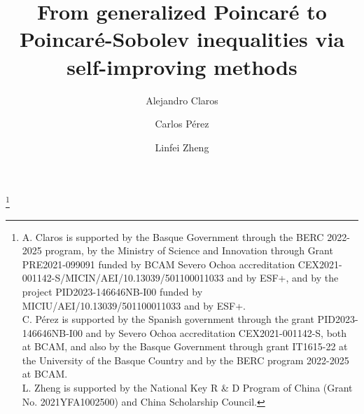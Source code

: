 \documentclass[reqno, 10pt, oneside]{amsart}
\numberwithin{equation}{section}
\numberwithin{theorem}{section}
\newcommand{\1}{{\rm 1\hspace*{-0.4ex}%
\rule{0.1ex}{1.52ex}\hspace*{0.2ex}}}
\begin{document}
\title[From generalized Poincaré to Poincaré-Sobolev inequalities]
{From generalized Poincaré to Poincaré-Sobolev inequalities via self-improving methods}






\author[A. Claros]{Alejandro Claros}
\address[A. Claros]{BCAM -- Basque Center for Applied Mathematics, Bilbao, Spain\newline
Universidad del Pa\'is Vasco / Euskal Herriko Unibertsitatea (UPV/EHU), Bilbao, Spain}





\author[C. P\'erez]{Carlos P\'erez}
\address[C. P\'erez]{BCAM -- Basque Center for Applied Mathematics, Bilbao, Spain\newline
Universidad del Pa\'is Vasco / Euskal Herriko Unibertsitatea (UPV/EHU), Bilbao, Spain\newline
Ikerbasque, Bilbao, Spain}



\author[L. Zheng]{Linfei Zheng}
\address[L. Zheng]{
    Center for Applied Mathematics, Tianjin University, Weijin Road 92, 300072 Tianjin, China		
    \newline
    BCAM -- Basque Center for Applied Mathematics, 48009 Bilbao, Spain}


\thanks{A. Claros is supported by the Basque Government through the BERC 2022-2025 program, by the Ministry of Science and Innovation through Grant PRE2021-099091 funded by BCAM Severo Ochoa accreditation CEX2021-001142-S/MICIN/AEI/10.13039/501100011033 and by ESF+, and by the project PID2023-146646NB-I00 funded by MICIU/AEI/10.13039/501100011033 and by ESF+. 
\\ \hspace*{1.5em}C. P\'erez is supported by the Spanish government through the grant PID2023-146646NB-I00 and by Severo Ochoa accreditation CEX2021-001142-S, both at BCAM, and also by the Basque Government through grant IT1615-22 at the University of the Basque Country and by the BERC program 2022-2025 at BCAM.
\\ \hspace*{1.5em} L. Zheng is supported by the National Key R \& D Program of China (Grant No. 2021YFA1002500) and China Scholarship Council.}




\end{document}
